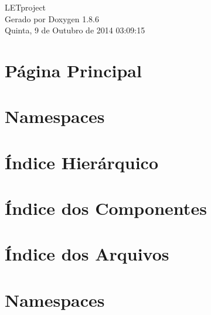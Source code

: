 \documentclass[twoside]{article}
\begin{document}
\hypersetup{pageanchor=false}
\begin{titlepage}
\vspace*{7cm}
\begin{center}%
{\Large L\-E\-Tproject }\\
\vspace*{1cm}
{\large Gerado por Doxygen 1.8.6}\\
\vspace*{0.5cm}
{\small Quinta, 9 de Outubro de 2014 03:09:15}\\
\end{center}
\end{titlepage}
\tableofcontents
{}
\hypersetup{pageanchor=true}

\section{Página Principal}
\label{index}\hypertarget{index}{}
\section{Namespaces}

\section{Índice Hierárquico}

\section{Índice dos Componentes}

\section{Índice dos Arquivos}

\section{Namespaces}






























\end{document}
